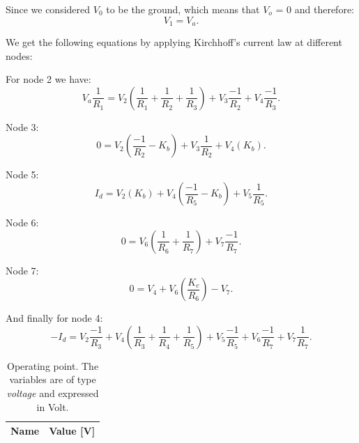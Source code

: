 Since we considered $V_0$ to be the ground, which means that $V_o$ = 0 and therefore:
\begin{equation}
	V_1 = V_a.
	\label{eq:kvl}
\end{equation}

We get the following equations by applying Kirchhoff's current law at different nodes:

For node 2 we have:
\begin{equation}
	 V_a\frac{1}{R_1} = V_2(\frac{1}{R_1} + \frac{1}{R_2} + \frac{1}{R_3}) + V_3\frac{-1}{R_2} + V_4\frac{-1}{R_3}.
\end{equation}

Node 3:
\begin{equation}
	0 = V_2(\frac{-1}{R_2} - K_b) + V_3\frac{1}{R_2} + V_4(K_b).
\end{equation}

Node 5:
\begin{equation}
	I_d = V_2(K_b) + V_4(\frac{-1}{R_5} - K_b) + V_5\frac{1}{R_5}.
\end{equation}

Node 6:
\begin{equation}
	0 = V_6(\frac{1}{R_6} + \frac{1}{R_7}) + V_7\frac{-1}{R_7} .
\end{equation}

Node 7:
\begin{equation}
	0 = V_4 + V_6(\frac{K_c}{R_6}) - V_7 .
\end{equation}

And finally for node 4:
\begin{equation}
	-I_d = V_2\frac{-1}{R_3} + V_4(\frac{1}{R_3} + \frac{1}{R_4} + \frac{1}{R_5}) + V_5\frac{-1}{R_5} + V_6\frac{-1}{R_7} + V_7\frac{1}{R_7}.
\end{equation}

\begin{table}[h]
  \centering
  \begin{tabular}{|l|r|}
    \hline    
    {\bf Name} & {\bf Value [V]} \\ \hline
    
  \end{tabular}
  \caption{Operating point. The variables are of type {\it voltage} and expressed in
    Volt.}
  \label{tab:op}
\end{table}

